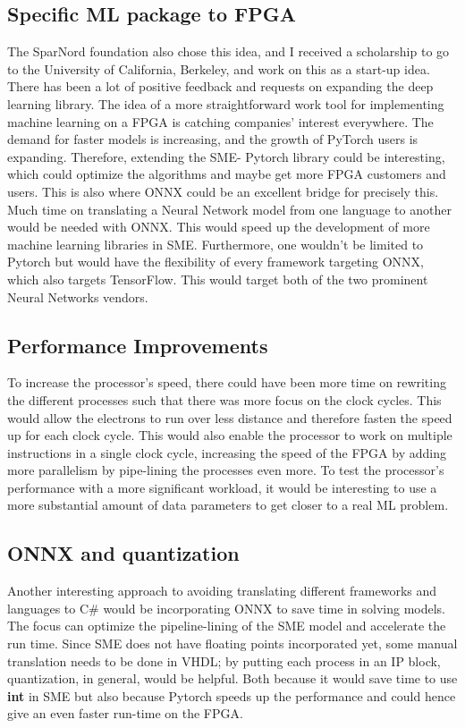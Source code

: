 \subsection{Specific ML package to FPGA}
The SparNord foundation also chose this idea, and I received a scholarship to go to the University of California, Berkeley, and work on this as a start-up idea. There has been a lot of positive feedback and requests on expanding the deep learning library.
The idea of a more straightforward work tool for implementing machine learning on a FPGA is catching companies’ interest everywhere. The demand for faster models is increasing, and the growth of PyTorch users is expanding. Therefore, extending the SME- Pytorch library could be interesting, which could optimize the algorithms and maybe get more FPGA customers and users. This is also where ONNX could be an excellent bridge for precisely this. Much time on translating a Neural Network model from one language to another would be needed with ONNX. This would speed up the development of more machine learning libraries in SME. Furthermore, one wouldn't be limited to Pytorch but would have the flexibility of every framework targeting ONNX, which also targets TensorFlow. This would target both of the two prominent Neural Networks vendors.

\subsection{Performance Improvements}
To increase the processor’s speed, there could have been more time on rewriting the different processes such that there was more focus on the clock cycles. This would allow the electrons to run over less distance and therefore fasten the speed up for each clock cycle. This would also enable the processor to work on multiple instructions in a single clock cycle, increasing the speed of the FPGA by adding more parallelism by pipe-lining the processes even more. To test the processor’s performance with a more significant workload, it would be interesting to use a more substantial amount of data parameters to get closer to a real ML problem.



\subsection{ONNX and quantization}
Another interesting approach to avoiding translating different frameworks and languages to C\# would be incorporating ONNX to save time in solving models. The focus can optimize the pipeline-lining of the SME model and accelerate the run time. Since SME does not have floating points incorporated yet, some manual translation needs to be done in VHDL; by putting each process in an IP block, quantization, in general, would be helpful. Both because it would save time to use \textbf{int} in SME but also because Pytorch speeds up the performance and could hence give an even faster run-time on the FPGA.



